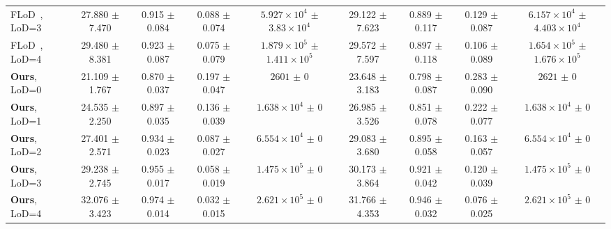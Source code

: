 {\begin{tabular}{lcccccccc}
    FLoD~\cite{seo2024flod}, LoD=3        & 27.880 $\pm$ 7.470                                    & 0.915 $\pm$ 0.084                              & 0.088 $\pm$ 0.074  & $5.927 \times 10^{4}$ $\pm$ $3.83 \times 10^{4}$  & 29.122 $\pm$ 7.623 & 0.889 $\pm$ 0.117 & 0.129 $\pm$ 0.087  & $6.157 \times 10^{4}$ $\pm$ $4.403 \times 10^{4}$ \\
    FLoD~\cite{seo2024flod}, LoD=4        & 29.480 $\pm$ 8.381                                    & 0.923 $\pm$ 0.087                              & 0.075 $\pm$ 0.079  & $1.879 \times 10^{5}$ $\pm$ $1.411 \times 10^{5}$ & 29.572 $\pm$ 7.597 & 0.897 $\pm$ 0.118 & 0.106 $\pm$ 0.089  & $1.654 \times 10^{5}$ $\pm$ $1.676 \times 10^{5}$ \\
    \midrule
    \textbf{Ours}, LoD=0                  & 21.109 $\pm$ 1.767                                    & 0.870 $\pm$ 0.037                              & 0.197 $\pm$ 0.047  & $2601$ $\pm$ $0$                                  & 23.648 $\pm$ 3.183 & 0.798 $\pm$ 0.087 & 0.283 $\pm$ 0.090  & $2621$ $\pm$ $0$                                  \\
    \textbf{Ours}, LoD=1                  & 24.535 $\pm$ 2.250                                    & 0.897 $\pm$ 0.035                              & 0.136 $\pm$ 0.039  & $1.638 \times 10^{4}$ $\pm$ $0$                   & 26.985 $\pm$ 3.526 & 0.851 $\pm$ 0.078 & 0.222 $\pm$ 0.077  & $1.638 \times 10^{4}$ $\pm$ $0$                   \\
    \textbf{Ours}, LoD=2                  & 27.401 $\pm$ 2.571                                    & 0.934 $\pm$ 0.023                              & 0.087 $\pm$ 0.027  & $6.554 \times 10^{4}$ $\pm$ $0$                   & 29.083 $\pm$ 3.680 & 0.895 $\pm$ 0.058 & 0.163 $\pm$ 0.057  & $6.554 \times 10^{4}$ $\pm$ $0$                   \\
    \textbf{Ours}, LoD=3                  & 29.238 $\pm$ 2.745                                    & 0.955 $\pm$ 0.017                              & 0.058 $\pm$ 0.019  & $1.475 \times 10^{5}$ $\pm$ $0$                   & 30.173 $\pm$ 3.864 & 0.921 $\pm$ 0.042 & 0.120 $\pm$ 0.039  & $1.475 \times 10^{5}$ $\pm$ $0$                   \\
    \textbf{Ours}, LoD=4                  & 32.076 $\pm$ 3.423                                    & 0.974 $\pm$ 0.014                              & 0.032 $\pm$ 0.015  & $2.621 \times 10^{5}$ $\pm$ $0$                   & 31.766 $\pm$ 4.353 & 0.946 $\pm$ 0.032 & 0.076 $\pm$ 0.025  & $2.621 \times 10^{5}$ $\pm$ $0$                   \\
    \bottomrule
  \end{tabular}
}
